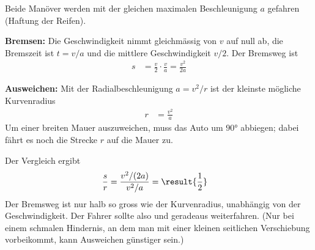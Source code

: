 \begin{center}
\end{center}

Beide Manöver werden mit der gleichen maximalen Beschleunigung $a$ gefahren (Haftung der Reifen).

\textbf{Bremsen:} Die Geschwindigkeit nimmt gleichmässig von $v$ auf null ab, die Bremszeit ist $t = v/a$ und die mittlere Geschwindigkeit $v/2$. Der Bremsweg ist
\begin{align}
 s &= \frac{v}{2}\cdot\frac{v}{a} = \frac{v^2}{2a}
\end{align}

\textbf{Ausweichen:} Mit der Radialbeschleunigung $a = v^2/r$ ist der kleinste mögliche Kurvenradius
\begin{align}
 r &= \frac{v^2}{a}
\end{align}
Um einer breiten Mauer auszuweichen, muss das Auto um $\ang{90}$ abbiegen; dabei fährt es noch die Strecke $r$ auf die Mauer zu.

Der Vergleich ergibt
\begin{align}
 \frac{s}{r} &= \frac{v^2/(2a)}{v^2/a} = \result{\frac{1}{2}}
\end{align}
Der Bremsweg ist nur halb so gross wie der Kurvenradius, unabhängig von der Geschwindigkeit. Der Fahrer sollte also  und geradeaus weiterfahren. (Nur bei einem schmalen Hindernis, an dem man mit einer kleinen seitlichen Verschiebung vorbeikommt, kann Ausweichen günstiger sein.)
